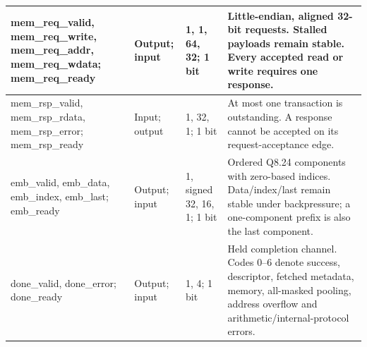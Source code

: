 \documentclass[11pt,a4paper]{article}
\begin{document}
{\begin{longtable}{@{}L{0.21\textwidth}|L{0.12\textwidth}|L{0.12\textwidth}|L{0.45\textwidth}@{}}
mem\_\allowbreak{}req\_\allowbreak{}valid,\allowbreak{} mem\_\allowbreak{}req\_\allowbreak{}write,\allowbreak{} mem\_\allowbreak{}req\_\allowbreak{}addr,\allowbreak{} mem\_\allowbreak{}req\_\allowbreak{}wdata; mem\_\allowbreak{}req\_\allowbreak{}ready & Output; input & 1,\allowbreak{} 1,\allowbreak{} 64,\allowbreak{} 32; 1 bit & Little-endian,\allowbreak{} aligned 32-bit requests. Stalled payloads remain stable. Every accepted read or write requires one response.\\[2pt]\hline

mem\_\allowbreak{}rsp\_\allowbreak{}valid,\allowbreak{} mem\_\allowbreak{}rsp\_\allowbreak{}rdata,\allowbreak{} mem\_\allowbreak{}rsp\_\allowbreak{}error; mem\_\allowbreak{}rsp\_\allowbreak{}ready & Input; output & 1,\allowbreak{} 32,\allowbreak{} 1; 1 bit & At most one transaction is outstanding. A response cannot be accepted on its request-acceptance edge.\\[2pt]\hline

emb\_\allowbreak{}valid,\allowbreak{} emb\_\allowbreak{}data,\allowbreak{} emb\_\allowbreak{}index,\allowbreak{} emb\_\allowbreak{}last; emb\_\allowbreak{}ready & Output; input & 1,\allowbreak{} signed 32,\allowbreak{} 16,\allowbreak{} 1; 1 bit & Ordered Q8.24 components with zero-based indices. Data/\allowbreak{}index/\allowbreak{}last remain stable under backpressure; a one-component prefix is also the last component.\\[2pt]\hline

done\_\allowbreak{}valid,\allowbreak{} done\_\allowbreak{}error; done\_\allowbreak{}ready & Output; input & 1,\allowbreak{} 4; 1 bit & Held completion channel. Codes 0–6 denote success,\allowbreak{} descriptor,\allowbreak{} fetched metadata,\allowbreak{} memory,\allowbreak{} all-masked pooling,\allowbreak{} address overflow and arithmetic/\allowbreak{}internal-protocol errors.\\[2pt]\hline

\bottomrule\end{longtable}}
\end{document}
